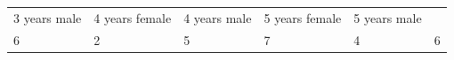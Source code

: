 \begin{enumerate}[noitemsep, label=\textbf{\arabic*}. ]
{\begin{tabular}[t]{|l|l|l|l|l|l|}
        3 years male &
        4 years female &
        4
years male &
        5 years female &
        5 years male%
     \tabularnewline\cline{1-1}\cline{2-2}\cline{3-3}\cline{4-4}\cline{5-5}\cline{6-6}
        6 &
        2 &
        5 &
        7 &
        4 &
        6%
     \tabularnewline\cline{1-1}\cline{2-2}\cline{3-3}\cline{4-4}\cline{5-5}\cline{6-6}
    \end{tabular}} %

\end{enumerate}
